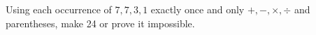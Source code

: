 Using each occurrence of $7,7,3,1$ exactly once and only $+,-,\times,\div$ and parentheses, make 24 or prove it impossible.
